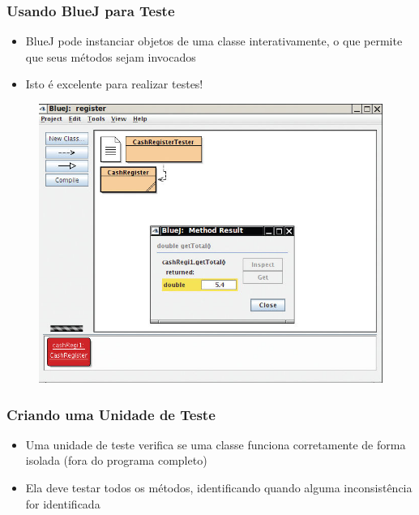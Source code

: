 \documentclass[xcolor={dvipsnames,table},aspectratio=169]{beamer}
\begin{document}
\begin{frame}[fragile]\frametitle{Usando BlueJ para Teste}
\begin{itemize}
	\item BlueJ pode instanciar objetos de uma classe interativamente, o que permite que seus métodos sejam invocados
	\item Isto é excelente para realizar testes!
\end{itemize}
\begin{figure}[h]
	\includegraphics[height=0.55\paperheight,center]{pucrs-ep-fprog-unidade_07-objetos_e_classes-laminas-bluej.jpg}
\end{figure}
\end{frame}

\begin{frame}[fragile]\frametitle{Criando uma Unidade de Teste}
\begin{itemize}
	\item Uma unidade de teste verifica se uma classe funciona corretamente de forma isolada (fora do programa completo)
	\item Ela deve testar todos os métodos, identificando quando alguma inconsistência for identificada
{\tiny\inputminted[bgcolor=cyan!10]{java}{src/caixa2/TestaCaixaRegistradora.java}}
\end{itemize}
\end{frame}

\end{document}
